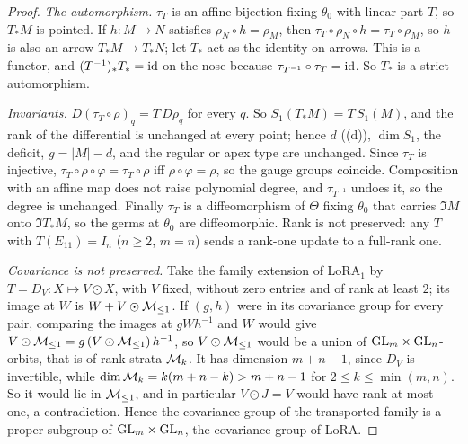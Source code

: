 \begin{proof}
\emph{The automorphism.} $\tau_T$ is an affine bijection fixing $\theta_0$ with linear part $T$, so $T_*M$ is pointed. If
$h:M\to N$ satisfies $\rho_N\circ h=\rho_M$, then $\tau_T\circ\rho_N\circ h=\tau_T\circ\rho_M$, so $h$ is also an arrow
$T_*M\to T_*N$; let $T_*$ act as the identity on arrows. This is a functor, and $(T^{-1})_*T_*=\mathrm{id}$ on the nose because
$\tau_{T^{-1}}\circ\tau_T=\mathrm{id}$. So $T_*$ is a strict automorphism.

\emph{Invariants.} $D(\tau_T\circ\rho)_q=T\,D\rho_q$ for every $q$. So $S_1(T_*M)=T\,S_1(M)$, and the rank of the differential
is unchanged at every point; hence $d$ ((d)), $\dim S_1$, the deficit, $g=\lvert M\rvert-d$, and the regular or
apex type are unchanged. Since $\tau_T$ is injective, $\tau_T\circ\rho\circ\varphi=\tau_T\circ\rho$ iff $\rho\circ\varphi=\rho$,
so the gauge groups coincide. Composition with an affine map does not raise polynomial degree, and $\tau_{T^{-1}}$ undoes
it, so the degree is unchanged. Finally $\tau_T$ is a diffeomorphism of $\Theta$ fixing $\theta_0$ that carries $\Im M$ onto
$\Im T_*M$, so the germs at $\theta_0$ are diffeomorphic. Rank is not preserved: any $T$ with $T(E_{11})=I_n$ ($n\ge2$, $m=n$)
sends a rank-one update to a full-rank one.

\emph{Covariance is not preserved.} Take the family extension of LoRA$_1$ by $T=D_V:X\mapsto V\odot X$, with $V$ fixed,
without zero entries and of rank at least $2$; its image at $W$ is $W+V\odot\mathcal{M}_{\le1}$. If $(g,h)$ were in its covariance
group for every pair, comparing the images at $gWh^{-1}$ and $W$ would give $V\odot\mathcal{M}_{\le1}=g\,(V\odot\mathcal{M}_{\le1})\,h^{-1}$, so
$V\odot\mathcal{M}_{\le1}$ would be a union of $\mathrm{GL}_m\times\mathrm{GL}_n$-orbits, that is of rank strata $\mathcal{M}_k$. It has dimension $m+n-1$,
since $D_V$ is invertible, while $\dim\mathcal{M}_k=k(m+n-k)>m+n-1$ for $2\le k\le\min(m,n)$. So it would lie in $\mathcal{M}_{\le1}$, and in
particular $V\odot J=V$ would have rank at most one, a contradiction. Hence the covariance group of the transported family is
a proper subgroup of $\mathrm{GL}_m\times\mathrm{GL}_n$, the covariance group of LoRA.


\end{proof}
